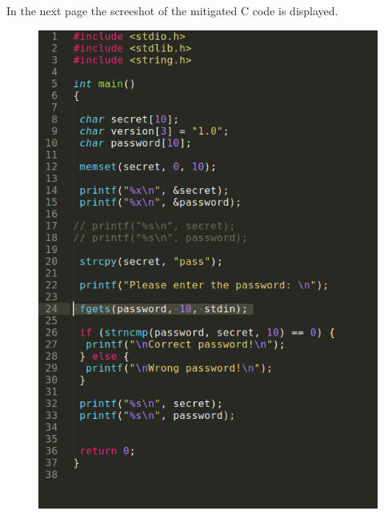 \documentclass[11pt]{article}
\begin{document}
\begin{enumerate}
In the next page the screeshot of the mitigated C code is displayed.

\begin{figure}
\centering
\includegraphics[scale=0.65]{image.png}
\end{figure}

\end{enumerate}
\end{document}
